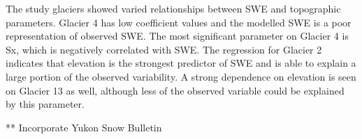 \documentclass{sfuthesis}
\begin{document}
The study glaciers showed varied relationships between SWE and topographic parameters. Glacier 4 has low coefficient values and the modelled SWE is a poor representation of observed SWE. The most significant parameter on Glacier 4 is Sx, which is negatively correlated with SWE. The regression for Glacier 2 indicates that elevation is the strongest predictor of SWE and is able to explain a large portion of the observed variability.  A strong dependence on elevation is seen on Glacier 13 as well, although less of the observed variable could be explained by this parameter. 

** Incorporate Yukon Snow Bulletin 
 
%
%
%
%
%

\backmatter%
	
	
\end{document}
